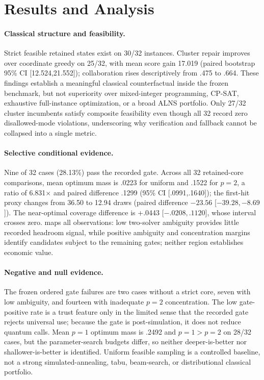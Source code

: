 \section{Results and Analysis}
\label{sec:results}

\paragraph{Classical structure and feasibility.}
Strict feasible retained states exist on 30/32 instances. Cluster repair improves over coordinate greedy on 25/32, with mean score gain 17.019 (paired bootstrap 95\% CI [12.524,21.552]); collaboration rises descriptively from .475 to .664. These findings establish a meaningful classical counterfactual inside the frozen benchmark, but not superiority over mixed-integer programming, CP-SAT, exhaustive full-instance optimization, or a broad ALNS portfolio. Only 27/32 cluster incumbents satisfy composite feasibility even though all 32 record zero disallowed-mode violations, underscoring why verification and fallback cannot be collapsed into a single metric.

\paragraph{Selective conditional evidence.}
Nine of 32 cases (28.13\%) pass the recorded gate. Across all 32 retained-core comparisons, mean optimum mass is .0223 for uniform and .1522 for $p=2$, a ratio of 6.831$\times$ and paired difference .1299 (95\% CI [.0991,.1640]); the first-hit proxy changes from 36.50 to 12.94 draws (paired difference $-23.56$ [${-39.28},{-8.69}$]). The near-optimal coverage difference is +.0443 [${-.0208},.1120$], whose interval crosses zero.  maps all observations: low two-solver ambiguity provides little recorded headroom signal, while positive ambiguity and concentration margins identify candidates subject to the remaining gates; neither region establishes economic value.




\paragraph{Negative and null evidence.}
The frozen ordered gate failures are two cases without a strict core, seven with low ambiguity, and fourteen with inadequate $p=2$ concentration. The low gate-positive rate is a trust feature only in the limited sense that the recorded gate rejects universal use; because the gate is post-simulation, it does not reduce quantum calls. Mean $p=1$ optimum mass is .2492 and $p=1>p=2$ on 28/32 cases, but the parameter-search budgets differ, so neither deeper-is-better nor shallower-is-better is identified. Uniform feasible sampling is a controlled baseline, not a strong simulated-annealing, tabu, beam-search, or distributional classical portfolio.

